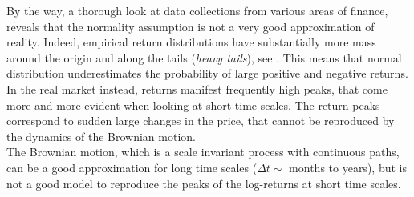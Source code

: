 By the way, a thorough look at data collections from various areas of finance, reveals that the normality assumption 
is not a very good approximation of reality.
Indeed, empirical return distributions have substantially 
more mass around the origin and along the tails (\emph{heavy tails}), see \cite{Cont01}.
This means that normal distribution underestimates the probability of large positive and negative returns. 
In the real market instead, returns manifest frequently high peaks, that come more and more evident when 
looking at short time scales.
The return peaks correspond to sudden large changes in the price, that cannot be reproduced by the dynamics of the Brownian motion.\\
The Brownian motion, which is a scale invariant process with continuous paths, can be a good approximation for long 
time scales ($\Delta t \sim$ months to years), but is not a good model to reproduce 
the peaks of the log-returns at short time scales.

